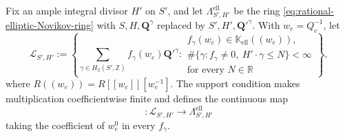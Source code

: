 \documentclass{amsart}
\theoremstyle{definition}
\numberwithin{equation}{section}
\newcommand{\Z}{\mathbb Z}
\newcommand{\K}{\mathbb K}
\begin{document}
Fix an ample integral divisor \(H'\) on \(S'\), and let \(\Lambda_{S',H'}^{\mathrm{ell}}\) be the ring \eqref{eq:rational-elliptic-Novikov-ring} with \(S,H,\mathbf Q^\gamma\) replaced by \(S',H',\mathbf Q'^\gamma\).  With \(w_e=Q_e^{-1}\), let
\begin{equation}
 \mathscr L_{S',H'}
 :=\left\{
  \sum_{\gamma\in H_2(S',\Z)}
  f_\gamma(w_e)\mathbf Q'^\gamma:
  \begin{array}{l}
   f_\gamma(w_e)\in\K_{\mathrm{ell}}((w_e)),\\
   \#\{\gamma:f_\gamma\ne0,\ H'\cdot\gamma\leq N\}<\infty\\
   \text{for every }N\in\mathbb R
  \end{array}
 \right\},
\label{eq:contraction-Laurent-ring}
\end{equation}
where \(R((w_e))=R[[w_e]][w_e^{-1}]\).  The support condition makes multiplication coefficientwise finite and defines the continuous map
\begin{equation}
 [w_e^0]:\mathscr L_{S',H'}
 \longrightarrow\Lambda_{S',H'}^{\mathrm{ell}}
\label{eq:contraction-constant-term-map}
\end{equation}
taking the coefficient of \(w_e^0\) in every \(f_\gamma\).
\end{document}
